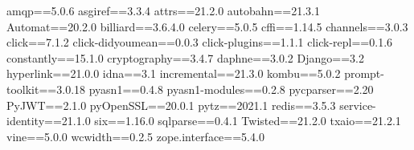 amqp==5.0.6
asgiref==3.3.4
attrs==21.2.0
autobahn==21.3.1
Automat==20.2.0
billiard==3.6.4.0
celery==5.0.5
cffi==1.14.5
channels==3.0.3
click==7.1.2
click-didyoumean==0.0.3
click-plugins==1.1.1
click-repl==0.1.6
constantly==15.1.0
cryptography==3.4.7
daphne==3.0.2
Django==3.2
hyperlink==21.0.0
idna==3.1
incremental==21.3.0
kombu==5.0.2
prompt-toolkit==3.0.18
pyasn1==0.4.8
pyasn1-modules==0.2.8
pycparser==2.20
PyJWT==2.1.0
pyOpenSSL==20.0.1
pytz==2021.1
redis==3.5.3
service-identity==21.1.0
six==1.16.0
sqlparse==0.4.1
Twisted==21.2.0
txaio==21.2.1
vine==5.0.0
wcwidth==0.2.5
zope.interface==5.4.0
